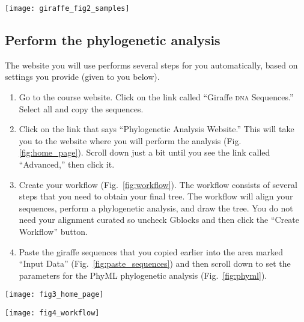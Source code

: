 \documentclass[11pt, addpoints]{exam}
\begin{document}
\begin{center}
	\texttt{[image: giraffe\_fig2\_samples]}
\end{center}

\subsection*{Perform the phylogenetic analysis}

The website you will use performs several steps for you automatically,
based on settings you provide (given to you below).

\begin{enumerate}
\item
  Go to the course website. Click on the link called “Giraffe \textsc{dna}
  Sequences.” Select all and copy the sequences.
\item
  Click on the link that says “Phylogenetic Analysis Website.” This
  will take you to the website where you will perform the analysis (Fig.
  \ref{fig:home_page}). Scroll down just a bit until you see the link called “Advanced,”
  then click it.
\item Create your workflow (Fig.~\ref{fig:workflow}). The workflow consists of several steps
  that you need to obtain your final tree. The workflow will align your
  sequences,  perform a phylogenetic analysis, and draw the
  tree. You do not need your alignment curated so uncheck Gblocks and
  then click the “Create Workflow” button.
\item
  Paste the giraffe sequences that you copied earlier into the area
  marked “Input Data” (Fig.~\ref{fig:paste_sequences}) and then scroll down to set the
  parameters for the PhyML phylogenetic analysis (Fig.~\ref{fig:phyml}).
\end{enumerate}

\begin{center}
	\texttt{[image: fig3\_home\_page]}
\end{center}

\vfill

\begin{center}
	\texttt{[image: fig4\_workflow]}
\end{center}
\end{document}
